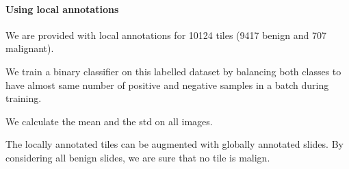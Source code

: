 \documentclass{article}
\begin{document}




\paragraph{Using local annotations}
We are provided with local annotations for 10124 tiles (9417 benign and 707 malignant).

We train a binary classifier on this labelled dataset by balancing both classes to have almost same number of positive and negative samples in a batch during training.

We calculate the mean and the std on all images.

The locally annotated tiles can be augmented with globally annotated slides. By considering all benign slides, we are sure that no tile is malign. 
\end{document}
